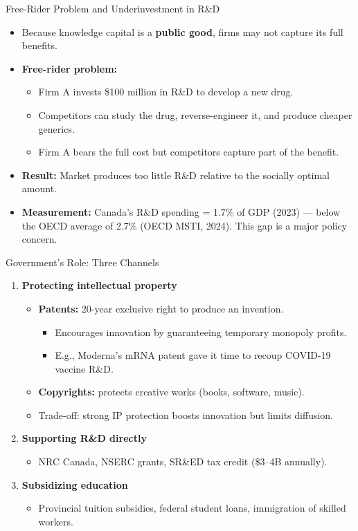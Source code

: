 \documentclass[aspectratio=169]{beamer}
\begin{document}
\begin{frame}{Free-Rider Problem and Underinvestment in R\&D}
\transfade
\begin{itemize}[<+->]
  \item Because knowledge capital is a \textbf{public good}, firms may not capture its full benefits.
  \item \textbf{Free-rider problem:}
  \begin{itemize}[<+->]
    \item Firm A invests \$100 million in R\&D to develop a new drug.
    \item Competitors can study the drug, reverse-engineer it, and produce cheaper generics.
    \item Firm A bears the full cost but competitors capture part of the benefit.
  \end{itemize}
  \item \textbf{Result:} Market produces \alert{too little} R\&D relative to the socially optimal amount.
  \item \textbf{Measurement:} Canada's R\&D spending = 1.7\% of GDP (2023) --- below the OECD average of 2.7\% (OECD MSTI, 2024). This gap is a major policy concern.
\end{itemize}
\end{frame}

\begin{frame}{Government's Role: Three Channels}
\transfade
\begin{enumerate}[<+->]
  \item \textbf{Protecting intellectual property}
  \begin{itemize}[<+->]
    \item \textbf{Patents:} 20-year exclusive right to produce an invention.
    \begin{itemize}[<+->]
      \item Encourages innovation by guaranteeing temporary monopoly profits.
      \item E.g., Moderna's mRNA patent gave it time to recoup COVID-19 vaccine R\&D.
    \end{itemize}
    \item \textbf{Copyrights:} protects creative works (books, software, music).
    \item Trade-off: strong IP protection boosts innovation but limits diffusion.
  \end{itemize}
  \item \textbf{Supporting R\&D directly}
  \begin{itemize}[<+->]
    \item NRC Canada, NSERC grants, SR\&ED tax credit (\$3--4B annually).
  \end{itemize}
  \item \textbf{Subsidizing education}
  \begin{itemize}[<+->]
    \item Provincial tuition subsidies, federal student loans, immigration of skilled workers.
  \end{itemize}
\end{enumerate}
\end{frame}
\end{document}
